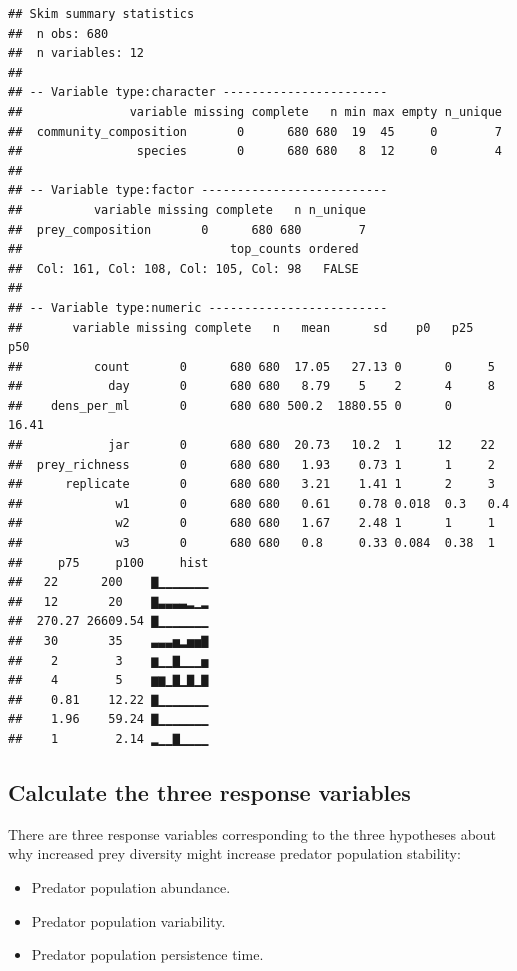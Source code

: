 \documentclass[]{book}
\providecommand{\tightlist}{%
  \setlength{\itemsep}{0pt}\setlength{\parskip}{0pt}}
\begin{document}
\begin{verbatim}
## Skim summary statistics
##  n obs: 680 
##  n variables: 12 
## 
## -- Variable type:character -----------------------
##               variable missing complete   n min max empty n_unique
##  community_composition       0      680 680  19  45     0        7
##                species       0      680 680   8  12     0        4
## 
## -- Variable type:factor --------------------------
##          variable missing complete   n n_unique
##  prey_composition       0      680 680        7
##                             top_counts ordered
##  Col: 161, Col: 108, Col: 105, Col: 98   FALSE
## 
## -- Variable type:numeric -------------------------
##       variable missing complete   n   mean      sd    p0   p25   p50
##          count       0      680 680  17.05   27.13 0      0     5   
##            day       0      680 680   8.79    5    2      4     8   
##    dens_per_ml       0      680 680 500.2  1880.55 0      0    16.41
##            jar       0      680 680  20.73   10.2  1     12    22   
##  prey_richness       0      680 680   1.93    0.73 1      1     2   
##      replicate       0      680 680   3.21    1.41 1      2     3   
##             w1       0      680 680   0.61    0.78 0.018  0.3   0.4 
##             w2       0      680 680   1.67    2.48 1      1     1   
##             w3       0      680 680   0.8     0.33 0.084  0.38  1   
##     p75     p100     hist
##   22      200    ▇▁▁▁▁▁▁▁
##   12       20    ▇▃▃▃▃▂▁▂
##  270.27 26609.54 ▇▁▁▁▁▁▁▁
##   30       35    ▃▃▃▅▂▅▅▇
##    2        3    ▆▁▁▇▁▁▁▅
##    4        5    ▆▆▁▇▁▇▁▇
##    0.81    12.22 ▇▁▁▁▁▁▁▁
##    1.96    59.24 ▇▁▁▁▁▁▁▁
##    1        2.14 ▂▁▁▇▁▁▁▁
\end{verbatim}

\hypertarget{calculate-the-three-response-variables}{%
\subsection{Calculate the three response variables}\label{calculate-the-three-response-variables}}

There are three response variables corresponding to the three hypotheses about why increased prey diversity might increase predator population stability:

\begin{itemize}
\tightlist
\item
  Predator population abundance.
\item
  Predator population variability.
\item
  Predator population persistence time.
\end{itemize}
\end{document}

